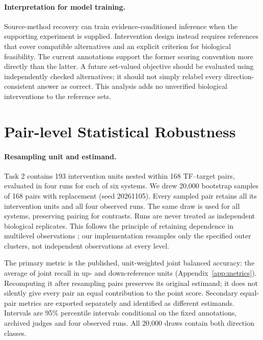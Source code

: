 \paragraph{Interpretation for model training.} Source-method recovery can train evidence-conditioned inference when the supporting experiment is supplied. Intervention design instead requires references that cover compatible alternatives and an explicit criterion for biological feasibility. The current annotations support the former scoring convention more directly than the latter. A future set-valued objective should be evaluated using independently checked alternatives; it should not simply relabel every direction-consistent answer as correct. This analysis adds no unverified biological interventions to the reference sets.

\clearpage
\section{Pair-level Statistical Robustness}\label{app:pair_bootstrap}
\paragraph{Resampling unit and estimand.} Task 2 contains 193 intervention units nested within 168 TF--target pairs, evaluated in four runs for each of six systems. We drew 20,000 bootstrap samples of 168 pairs with replacement (seed 20261105). Every sampled pair retains all its intervention units and all four observed runs. The same draw is used for all systems, preserving pairing for contrasts. Runs are never treated as independent biological replicates. This follows the principle of retaining dependence in multilevel observations \cite{saravanan2020bootstrap}; our implementation resamples only the specified outer clusters, not independent observations at every level.

The primary metric is the published, unit-weighted joint balanced accuracy: the average of joint recall in up- and down-reference units (Appendix~\ref{app:metrics}). Recomputing it after resampling pairs preserves its original estimand; it does not silently give every pair an equal contribution to the point score. Secondary equal-pair metrics are exported separately and identified as different estimands. Intervals are 95\% percentile intervals conditional on the fixed annotations, archived judges and four observed runs. All 20,000 draws contain both direction classes.

